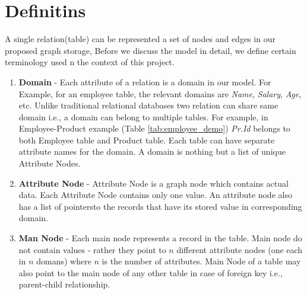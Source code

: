 \documentclass[12pt, oneside]{book}
\begin{document}
\section{Definitins}
A single relation(table) can be represented a set of nodes and edges in our proposed graph storage, Before we discuss the model in detail, we define certain terminology used n the context of this project.
\begin{enumerate}
 \item \textbf{Domain} - Each attribute of a relation is a domain in our model. For Example, for an employee table, the relevant domains are \emph{Name}, \emph{Salary}, \emph{Age}, etc. Unlike traditional relational databases two relation can share same domain i.e., a domain can belong to multiple tables. For example, in Employee-Product example (Table \ref{tab:employee_demo}) \emph{Pr.Id} belongs to both Employee table and Product table. Each table can have separate attribute names for the domain. A domain is nothing but a list of unique Attribute Nodes.
 \item \textbf{Attribute Node} - Attribute Node is a graph node which contains actual data. Each Attribute Node contains only one value. An attribute node also has a list of pointersto the records that have its stored value in corresponding domain.
 \item \textbf{Man Node} - Each main node represents a record in the table. Main node do not contain values - rather they point to $n$ different attribute nodes (one each in $n$ domans) where $n$ is the number of attributes. Main Node of a table may also point to the main node of any other table in case of foreign key i.e., parent-child relationship.
\end{enumerate}
\end{document}
